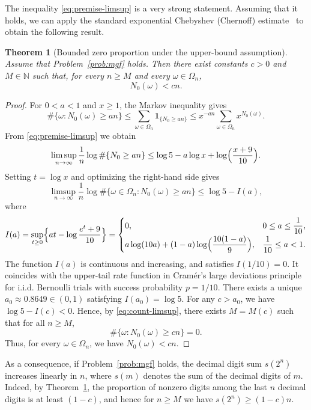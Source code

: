 \documentclass[11pt,a4paper]{article}
\newtheorem{theorem}{Theorem}
\theoremstyle{plain}
\begin{document}
The inequality \eqref{eq:premise-limsup} is a very strong statement.  
Assuming that it holds, we can apply the standard exponential Chebyshev (Chernoff) estimate~\cite[§2.2]{dembo1998}  
to obtain the following result.

\begin{theorem}[Bounded zero proportion under the upper-bound assumption]\label{thm:zero_num}
Assume that Problem~\ref{prob:mgf} holds.  
Then there exist constants $c>0$ and $M\in\mathbb{N}$ such that,  
for every $n \ge M$ and every $\omega \in \Omega_n$,
\[
N_0(\omega) < c n.
\]
\end{theorem}

\begin{proof}
For $0<a<1$ and $x\ge1$, the Markov inequality gives
\[
\#\{\omega: N_0(\omega)\ge an\}
\le
\sum_{\omega\in\Omega_n} \mathbf{1}_{\{N_0\ge an\}}
\le
x^{-an}\sum_{\omega\in\Omega_n}x^{N_0(\omega)}.
\]
From \eqref{eq:premise-limsup} we obtain
\[
\limsup_{n\to\infty}\frac{1}{n}\log\#\{N_0\ge an\}
\le
\log5 - a\log x + \log\Bigl(\frac{x+9}{10}\Bigr).
\]
Setting $t=\log x$ and optimizing the right-hand side gives
\begin{equation}\label{eq:count-limsup}
\limsup_{n\to\infty}\frac{1}{n}\log\#\{\omega\in\Omega_n: N_0(\omega)\ge an\}
\le
\log5 - I(a),
\end{equation}
where
\[
I(a)=\sup_{t\ge0}\Bigl\{a t - \log\frac{e^{t}+9}{10}\Bigr\}
=
\begin{cases}
0, & 0\le a\le \displaystyle \frac{1}{10},\\[1ex]
\displaystyle a\log(10a)+(1-a)\log \Bigl(\frac{10(1-a)}{9}\Bigr), & \displaystyle \frac{1}{10}\le a<1.
\end{cases}
\]
The function $I(a)$ is continuous and increasing, and satisfies $I(1/10)=0$.  
It coincides with the upper-tail rate function in Cramér’s large deviations principle  
for i.i.d. Bernoulli trials with success probability $p=1/10$.  
There exists a unique $a_0 \approx 0.8649 \in(0,1)$ satisfying $I(a_0)=\log5$.  
For any $c>a_0$, we have $\log5-I(c)<0$.  
Hence, by \eqref{eq:count-limsup}, there exists $M=M(c)$ such that for all $n\ge M$,
\[
\#\{\omega: N_0(\omega)\ge c n\}=0.
\]
Thus, for every $\omega\in\Omega_n$, we have $N_0(\omega)<c n$.
\end{proof}

As a consequence, if Problem~\ref{prob:mgf} holds,  
the decimal digit sum $s(2^n)$ increases linearly in $n$, 
where $s(m)$ denotes the sum of the decimal digits of $m$. 
Indeed, by Theorem~\ref{thm:zero_num}, the proportion of nonzero digits among the last $n$ decimal digits is at least $(1-c)$,  
and hence for $n\ge M$ we have $s(2^n)\ge (1-c)n$.
\end{document}
